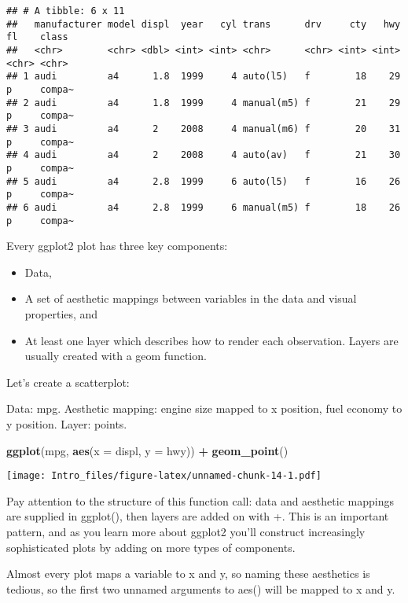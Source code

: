 \documentclass[
]{article}
\newenvironment{Shaded}{\begin{snugshade}}{\end{snugshade}}
\newcommand{\AttributeTok}[1]{\textcolor[rgb]{0.13,0.29,0.53}{#1}}
\newcommand{\FunctionTok}[1]{\textcolor[rgb]{0.13,0.29,0.53}{\textbf{#1}}}
\newcommand{\NormalTok}[1]{#1}
\newcommand{\SpecialCharTok}[1]{\textcolor[rgb]{0.81,0.36,0.00}{\textbf{#1}}}
\begin{document}
\begin{verbatim}
## # A tibble: 6 x 11
##   manufacturer model displ  year   cyl trans      drv     cty   hwy fl    class 
##   <chr>        <chr> <dbl> <int> <int> <chr>      <chr> <int> <int> <chr> <chr> 
## 1 audi         a4      1.8  1999     4 auto(l5)   f        18    29 p     compa~
## 2 audi         a4      1.8  1999     4 manual(m5) f        21    29 p     compa~
## 3 audi         a4      2    2008     4 manual(m6) f        20    31 p     compa~
## 4 audi         a4      2    2008     4 auto(av)   f        21    30 p     compa~
## 5 audi         a4      2.8  1999     6 auto(l5)   f        16    26 p     compa~
## 6 audi         a4      2.8  1999     6 manual(m5) f        18    26 p     compa~
\end{verbatim}

Every ggplot2 plot has three key components:

\begin{itemize}
\item
  Data,
\item
  A set of aesthetic mappings between variables in the data and visual
  properties, and
\item
  At least one layer which describes how to render each observation.
  Layers are usually created with a geom function.
\end{itemize}

Let's create a scatterplot:

Data: mpg. Aesthetic mapping: engine size mapped to x position, fuel
economy to y position. Layer: points.

\begin{Shaded}
\begin{Highlighting}[]
\FunctionTok{ggplot}\NormalTok{(mpg, }\FunctionTok{aes}\NormalTok{(}\AttributeTok{x =}\NormalTok{ displ, }\AttributeTok{y =}\NormalTok{ hwy)) }\SpecialCharTok{+} 
  \FunctionTok{geom\_point}\NormalTok{()}
\end{Highlighting}
\end{Shaded}

\texttt{[image: Intro\_files/figure-latex/unnamed-chunk-14-1.pdf]}

Pay attention to the structure of this function call: data and aesthetic
mappings are supplied in ggplot(), then layers are added on with +. This
is an important pattern, and as you learn more about ggplot2 you'll
construct increasingly sophisticated plots by adding on more types of
components.

Almost every plot maps a variable to x and y, so naming these aesthetics
is tedious, so the first two unnamed arguments to aes() will be mapped
to x and y.
\end{document}

